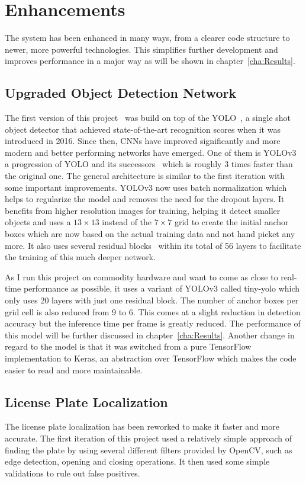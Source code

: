 \chapter{Enhancements} \label{cha:Enhancements}

The system has been enhanced in many ways, from a clearer code structure to newer, more powerful technologies.
This simplifies further development and improves performance in a major way as will be shown in chapter~\ref{cha:Results}.


\section{Upgraded Object Detection Network}
The first version of this project~\cite{Berger2018} was build on top of the YOLO~\cite{Redmon}, a single shot object detector that achieved state-of-the-art recognition scores when it was introduced in 2016.
Since then, CNNs have improved significantly and more modern and better performing networks have emerged.
One of them is YOLOv3~\cite{yolov3} a progression of YOLO and its successors~\cite{Redmon2017} which is roughly 3 times faster than the original one.
The general architecture is similar to the first iteration with some important improvements.
YOLOv3 now uses batch normalization which helps to regularize the model and removes the need for the dropout layers.
It benefits from higher resolution images for training, helping it detect smaller objects and uses a $13 \times 13$ instead of the $7 \times 7$ grid to create the initial anchor boxes which are now based on the actual training data and not hand picket any more.
It also uses several residual blocks~\cite{He2016} within its total of 56 layers to facilitate the training of this much deeper network.

As I run this project on commodity hardware and want to come as close to real-time performance as possible, it uses a variant of YOLOv3 called tiny-yolo which only uses 20 layers with just one residual block.
The number of anchor boxes per grid cell is also reduced from 9 to 6.
This comes at a slight reduction in detection accuracy but the inference time per frame is greatly reduced.
The performance of this model will be further discussed in chapter~\ref{cha:Results}.
Another change in regard to the model is that it was switched from a pure TensorFlow implementation to Keras, an abstraction over TensorFlow which makes the code easier to read and more maintainable.


\section{License Plate Localization}
The license plate localization has been reworked to make it faster and more accurate.
The first iteration of this project used a relatively simple approach of finding the plate by using several different filters provided by OpenCV, such as edge detection, opening and closing operations.
It then used some simple validations to rule out false positives.

